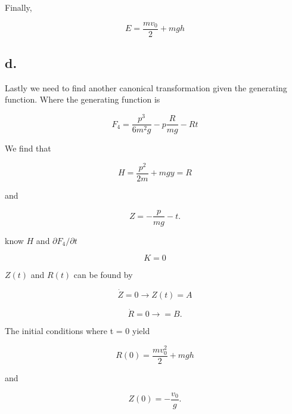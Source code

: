 \documentclass[12pt]{article}
\begin{document}
Finally,

$$
E = \frac{m v_{0}}{2} + mgh
$$


\subsection*{d.}

Lastly we need to find another canonical transformation given the generating function. Where the generating function is 

$$
F_{4} = \frac{p^{3}}{6m^{2}g} - p\frac{R}{mg} - Rt
$$

We find that 

$$
H = \frac{p^{2}}{2m} + mgy = R
$$

and 

$$
Z = -\frac{p}{mg} - t.
$$

know $H$ and $\partial F_4/ \partial t$ 

$$
K = 0
$$

$Z(t)$ and $R(t)$ can be found by 

$$
\dot{Z} = 0 \rightarrow Z(t) = A
$$

$$
\dot{R} = 0 \rightarrow = B.
$$

The initial conditions where t = 0 yield

$$
R(0) = \frac{mv_{0}^{2}}{2} + mgh
$$

and 

$$
Z(0) = -\frac{v_{0}}{g}.
$$

 
\end{document}
